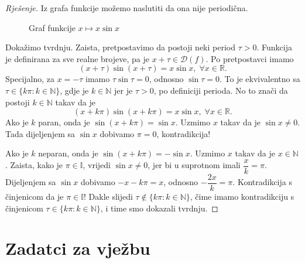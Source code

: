 \begin{proof}[Rješenje]
Iz grafa funkcije možemo naslutiti da ona nije periodična.
\begin{figure}[ht]
\begin{center}
\end{center}
\caption{\label{gr6} Graf funkcije $x\mapsto x\sin{x}$}
\end{figure}

Dokažimo tvrdnju. Zaista, pretpostavimo da postoji neki period $\tau>0$. Funkcija je definirana za sve realne brojeve, pa je $x+\tau\in \mathcal{D}(f)$. Po pretpostavci imamo $$(x+\tau)\sin(x+\tau)=x\sin{x},\; \forall x\in \mathbb{R}.$$ 
Specijalno, za $x=-\tau$ imamo $\tau\sin{\tau}=0$, odnosno $\sin{\tau}=0$. To je ekvivalentno sa $\tau\in \{k\pi : k\in \mathbb{N}\}$, gdje je $k\in \mathbb{N}$ jer je $\tau>0$, po definiciji perioda. No to znači da postoji $k\in \mathbb{N}$ takav da je $$(x+k\pi)\sin(x+k\pi)=x\sin{x},\;\forall x\in \mathbb{R}.$$ Ako je $k$ paran, onda je $\sin(x+k\pi)=\sin{x}$. Uzmimo $x$ takav da je $\sin{x}\neq 0$. Tada dijeljenjem sa $\sin{x}$ dobivamo $\pi=0$, kontradikcija! 

Ako je $k$ neparan, onda je $\sin(x+k\pi)=-\sin{x}$. Uzmimo $x$ takav da je $x\in \mathbb{N}$. Zaista, kako je $\pi\in \mathbb{I}$, vrijedi $\sin{x}\neq 0$, jer bi u suprotnom imali $\dfrac{x}{k}=\pi$. Dijeljenjem sa $\sin{x}$ dobivamo $-x-k\pi=x$, odnosno $-\dfrac{2x}{k}=\pi$. Kontradikcija s činjenicom da je $\pi\in \mathbb{I}$! Dakle slijedi $\tau\notin \{k\pi : k\in \mathbb{N}\}$, čime imamo kontradikciju s činjenicom $\tau\in \{k\pi : k\in \mathbb{N}\}$, i time smo dokazali tvrdnju.
\end{proof}
\newpage
\section*{Zadatci za vježbu}
